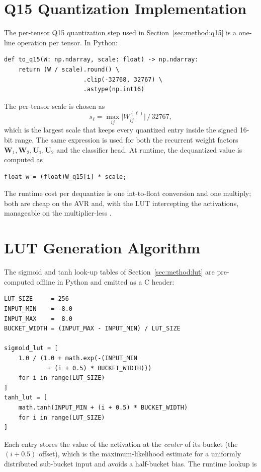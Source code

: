 \section{Q15 Quantization Implementation}
\label{app:q15}

The per-tensor Q15 quantization step used in
Section~\ref{sec:method:q15} is a one-line operation per tensor. In
Python:

\begin{verbatim}
def to_q15(W: np.ndarray, scale: float) -> np.ndarray:
    return (W / scale).round() \
                      .clip(-32768, 32767) \
                      .astype(np.int16)
\end{verbatim}

The per-tensor scale is chosen as
\[
s_\ell = \max_{ij}\bigl|W^{(\ell)}_{ij}\bigr| \,\big/\, 32767,
\]
which is the largest scale that keeps every quantized entry inside
the signed 16-bit range. The same expression is used for both the
recurrent weight factors $\mathbf{W}_1, \mathbf{W}_2,
\mathbf{U}_1, \mathbf{U}_2$ and the classifier head. At runtime, the
dequantized value is computed as

\begin{verbatim}
float w = (float)W_q15[i] * scale;
\end{verbatim}

The runtime cost per dequantize is one int-to-float conversion and
one multiply; both are cheap on the AVR and, with the LUT
intercepting the activations, manageable on the multiplier-less
\msp{}.

\section{LUT Generation Algorithm}
\label{app:lut}

The sigmoid and tanh look-up tables of Section~\ref{sec:method:lut}
are pre-computed offline in Python and emitted as a C header:

\begin{verbatim}
LUT_SIZE     = 256
INPUT_MIN    = -8.0
INPUT_MAX    =  8.0
BUCKET_WIDTH = (INPUT_MAX - INPUT_MIN) / LUT_SIZE

sigmoid_lut = [
    1.0 / (1.0 + math.exp(-(INPUT_MIN
            + (i + 0.5) * BUCKET_WIDTH)))
    for i in range(LUT_SIZE)
]
tanh_lut = [
    math.tanh(INPUT_MIN + (i + 0.5) * BUCKET_WIDTH)
    for i in range(LUT_SIZE)
]
\end{verbatim}

Each entry stores the value of the activation at the
\emph{center} of its bucket (the $(i + 0.5)$ offset), which is
the maximum-likelihood estimate for a uniformly distributed
sub-bucket input and avoids a half-bucket bias. The runtime lookup is

